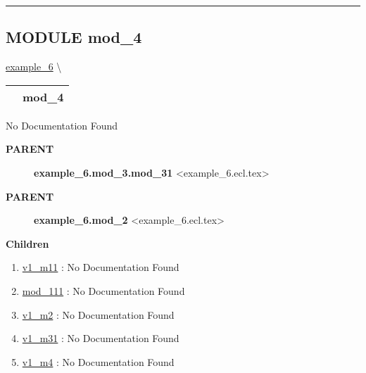 \rule{\linewidth}{0.5pt}




\subsection*{\textsf{\colorbox{headtoc}{\color{white} MODULE}
mod\_4}}

\hypertarget{ecldoc:example_6.mod_4}{}
\hspace{0pt} \hyperlink{ecldoc:example_6}{example_6} \textbackslash 

{\renewcommand{\arraystretch}{1.5}
\begin{tabularx}{\textwidth}{|>{\raggedright\arraybackslash}l|X|}
\hline
\hspace{0pt}\mytexttt{\color{red} } & \textbf{mod\_4} \\
\hline
\end{tabularx}
}

\par





No Documentation Found










\par
\begin{description}
\item [\colorbox{tagtype}{\color{white} \textbf{\textsf{PARENT}}}] \textbf{example\_6.mod\_3.mod\_31} <example\_6.ecl.tex>
\item [\colorbox{tagtype}{\color{white} \textbf{\textsf{PARENT}}}] \textbf{example\_6.mod\_2} <example\_6.ecl.tex>
\end{description}


\textbf{Children}
\begin{enumerate}
\item \hyperlink{ecldoc:example_6.mod_1.mod_11.v1_m11}{v1\_m11}
: No Documentation Found
\item \hyperlink{ecldoc:example_6.mod_1.mod_11.mod_111}{mod\_111}
: No Documentation Found
\item \hyperlink{ecldoc:example_6.mod_2.v1_m2}{v1\_m2}
: No Documentation Found
\item \hyperlink{ecldoc:example_6.mod_3.mod_31.v1_m31}{v1\_m31}
: No Documentation Found
\item \hyperlink{ecldoc:example_6.mod_4.v1_m4}{v1\_m4}
: No Documentation Found
\end{enumerate}

